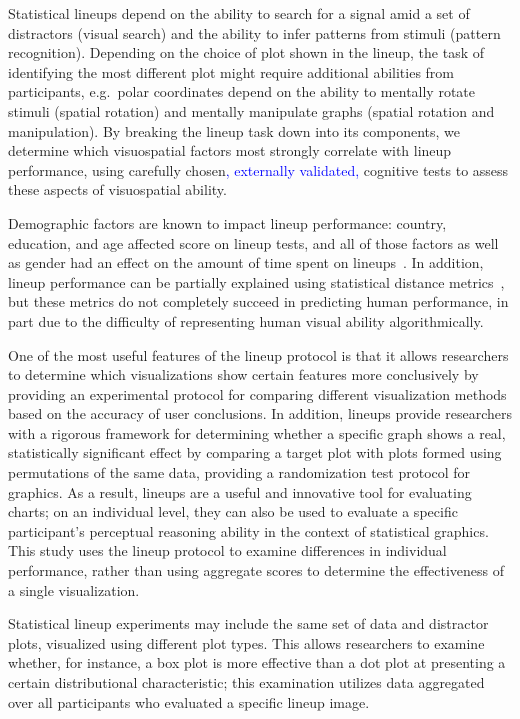 \documentclass[journal]{vgtc}\usepackage[]{graphicx}\usepackage[]{color}
\newcommand{\newtext}[1]{\textcolor{blue}{#1}}
\begin{document}
Statistical lineups depend on the ability to search for a signal amid a set of distractors (visual search) and the ability to infer patterns from stimuli (pattern recognition). Depending on the choice of plot shown in the lineup, the task of identifying the most different plot might require additional abilities from participants, e.g.~polar coordinates depend on the ability to mentally rotate stimuli (spatial rotation) and mentally manipulate graphs (spatial rotation and manipulation). By breaking the lineup task down into its components, we  determine which visuospatial factors most strongly correlate with lineup performance, using carefully chosen\newtext{, externally validated,} cognitive tests to assess these aspects of visuospatial ability. 

Demographic factors are known to impact lineup performance: country, education, and age affected score on lineup tests, and all of those factors as well as gender had an effect on the amount of time spent on lineups~\cite{humanfactorslineups}. In addition, lineup performance can be partially explained using statistical distance metrics~\cite{distancemetriclineups}, but these metrics do not completely succeed in predicting human performance, in part due to the difficulty of representing human visual ability algorithmically.

One of the most useful features of the lineup protocol is that it allows researchers to determine which visualizations show certain features more conclusively by providing an experimental protocol for comparing different visualization methods based on the accuracy of user conclusions. In addition, lineups provide researchers with a rigorous framework for determining whether a specific graph shows a real, statistically significant effect by comparing a target plot with plots formed using permutations of the same data, providing a randomization test protocol for graphics. As a result, lineups are a useful and innovative tool for evaluating charts; on an individual level, they can also be used to evaluate a specific participant's perceptual reasoning ability in the context of statistical graphics.
This study uses the lineup protocol to examine differences in individual performance, rather than using aggregate scores to determine the effectiveness of a single visualization. 

Statistical lineup experiments may include the same set of data and distractor plots, visualized using different plot types. This allows researchers to examine whether, for instance, a box plot is more effective than a dot plot at presenting a certain distributional characteristic; this examination utilizes data aggregated over all participants who evaluated a specific lineup image. 
\end{document}
